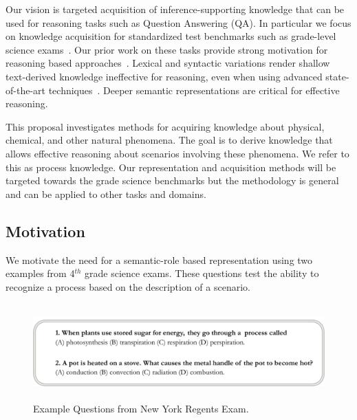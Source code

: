 Our vision is targeted acquisition of inference-supporting knowledge that can be used for reasoning tasks such as Question Answering (QA).
In particular we focus on knowledge acquisition for standardized test benchmarks such as grade-level science exams~\cite{clark2015elementary}.  Our prior work on these tasks provide strong motivation for reasoning based approaches~\cite{clark2014:akbc,chb2013:akbc}.
Lexical and syntactic variations render shallow text-derived knowledge ineffective for reasoning, even when using advanced state-of-the-art techniques~\cite{khot2015:emlnlp}. 
Deeper semantic representations are critical for effective reasoning.

This proposal investigates methods for acquiring knowledge about physical, chemical, and other natural phenomena.
The goal is to derive knowledge that allows effective reasoning about scenarios involving these phenomena. We refer to this as process knowledge. 
Our representation and acquisition methods will be targeted towards the grade science benchmarks but the methodology is general and can be applied to other tasks and domains.

\subsection{Motivation}
We motivate the need for a semantic-role based representation using two examples from 4$^{th}$ grade science exams. These questions test the ability to recognize a process based on the description of a scenario. \\

\begin{figure}[hbt]
	\begin{center}
	\vspace{-1em}
	\includegraphics[width=6.04in,height=1.45in]{figures/questions-stretch.pdf} 	
	\caption{\label{fig:questions} {Example Questions from New York Regents Exam.}}
	\end{center}
\end{figure}


